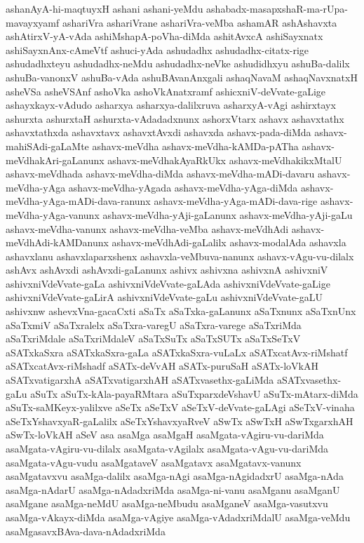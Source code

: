 {ashanAyA-hi-maqtuyxH
ashani
ashani-yeMdu
ashabadx-masapxshaR-ma-rUpa-mavayxyamf
ashariVra
ashariVrane
ashariVra-veMba
ashamAR
ashAshavxta
ashAtirxV-yA-vAda
ashiMshapA-poVha-diMda
ashitAvxcA
ashiSayxnatx
ashiSayxnAnx-cAmeVtf
ashuci-yAda
ashudadhx
ashudadhx-citatx-rige
ashudadhxteyu
ashudadhx-neMdu
ashudadhx-neVke
ashudidhxyu
ashuBa-dalilx
ashuBa-vanonxV
ashuBa-vAda
ashuBAvanAnxgali
ashaqNavaM
ashaqNavxnatxH
asheVSa
asheVSAnf
ashoVka
ashoVkAnatxramf
ashicxniV-deVvate-gaLige
ashayxkayx-vAdudo
asharxya
asharxya-dalilxruva
asharxyA-vAgi
ashirxtayx
ashurxta
ashurxtaH
ashurxta-vAdadadxnunx
ashorxVtarx
ashavx
ashavxtathx
ashavxtathxda
ashavxtavx
ashavxtAvxdi
ashavxda
ashavx-pada-diMda
ashavx-mahiSAdi-gaLaMte
ashavx-meVdha
ashavx-meVdha-kAMDa-pATha
ashavx-meVdhakAri-gaLanunx
ashavx-meVdhakAyaRkUkx
ashavx-meVdhakikxMtalU
ashavx-meVdhada
ashavx-meVdha-diMda
ashavx-meVdha-mADi-davaru
ashavx-meVdha-yAga
ashavx-meVdha-yAgada
ashavx-meVdha-yAga-diMda
ashavx-meVdha-yAga-mADi-dava-ranunx
ashavx-meVdha-yAga-mADi-dava-rige
ashavx-meVdha-yAga-vanunx
ashavx-meVdha-yAji-gaLanunx
ashavx-meVdha-yAji-gaLu
ashavx-meVdha-vanunx
ashavx-meVdha-veMba
ashavx-meVdhAdi
ashavx-meVdhAdi-kAMDanunx
ashavx-meVdhAdi-gaLalilx
ashavx-modalAda
ashavxla
ashavxlanu
ashavxlaparxshenx
ashavxla-veMbuva-nanunx
ashavx-vAgu-vu-dilalx
ashAvx
ashAvxdi
ashAvxdi-gaLanunx
ashivx
ashivxna
ashivxnA
ashivxniV
ashivxniVdeVvate-gaLa
ashivxniVdeVvate-gaLAda
ashivxniVdeVvate-gaLige
ashivxniVdeVvate-gaLirA
ashivxniVdeVvate-gaLu
ashivxniVdeVvate-gaLU
ashivxnw
ashevxVna-gacaCxti
aSaTx
aSaTxka-gaLanunx
aSaTxnunx
aSaTxnUnx
aSaTxmiV
aSaTxralelx
aSaTxra-varegU
aSaTxra-varege
aSaTxriMda
aSaTxriMdale
aSaTxriMdaleV
aSaTxSuTx
aSaTxSUTx
aSaTxSeTxV
aSATxkaSxra
aSATxkaSxra-gaLa
aSATxkaSxra-vuLaLx
aSATxcatAvx-riMshatf
aSATxcatAvx-riMshadf
aSATx-deVvAH
aSATx-puruSaH
aSATx-loVkAH
aSATxvatigarxhA
aSATxvatigarxhAH
aSATxvasethx-gaLiMda
aSATxvasethx-gaLu
aSuTx
aSuTx-kAla-payaRMtara
aSuTxparxdeVshavU
aSuTx-mAtarx-diMda
aSuTx-saMKeyx-yalilxve
aSeTx
aSeTxV
aSeTxV-deVvate-gaLAgi
aSeTxV-vinaha
aSeTxYshavxyaR-gaLalilx
aSeTxYshavxyaRveV
aSwTx
aSwTxH
aSwTxgarxhAH
aSwTx-loVkAH
aSeV
asa
asaMga
asaMgaH
asaMgata-vAgiru-vu-dariMda
asaMgata-vAgiru-vu-dilalx
asaMgata-vAgilalx
asaMgata-vAgu-vu-dariMda
asaMgata-vAgu-vudu
asaMgataveV
asaMgatavx
asaMgatavx-vanunx
asaMgatavxvu
asaMga-dalilx
asaMga-nAgi
asaMga-nAgidadxrU
asaMga-nAda
asaMga-nAdarU
asaMga-nAdadxriMda
asaMga-ni-vanu
asaMganu
asaMganU
asaMgane
asaMga-neMdU
asaMga-neMbudu
asaMganeV
asaMga-vasutxvu
asaMga-vAkayx-diMda
asaMga-vAgiye
asaMga-vAdadxriMdalU
asaMga-veMdu
asaMgasavxBAva-dava-nAdadxriMda
}
